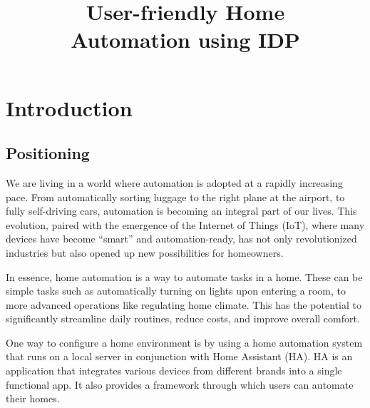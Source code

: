 \documentclass[11pt,a4paper]{report}
\title{User-friendly Home\\ Automation using IDP}
\subtitle{}
\begin{document}
\preface%

\printnoidxglossary[type=\acronymtype]%
\clearpage

%
%
%





\chapter{Introduction}
\section{Positioning}
We are living in a world where automation is adopted at a rapidly increasing pace. From automatically sorting luggage to the right plane at the airport, to fully self-driving cars, automation is becoming an integral part of our lives. This evolution, paired with the emergence of the Internet of Things (IoT), where many devices have become ``smart'' and automation-ready, has not only revolutionized industries but also opened up new possibilities for homeowners.

In essence, home automation is a way to automate tasks in a home. These can be simple tasks such as automatically turning on lights upon entering a room, to more advanced operations like regulating home climate. This has the potential to significantly streamline daily routines, reduce costs, and improve overall comfort.

One way to configure a home environment is by using a home automation system that runs on a local server in conjunction with Home Assistant (HA). HA is an application that integrates various devices from different brands into a single functional app. It also provides a framework through which users can automate their homes.
\end{document}
